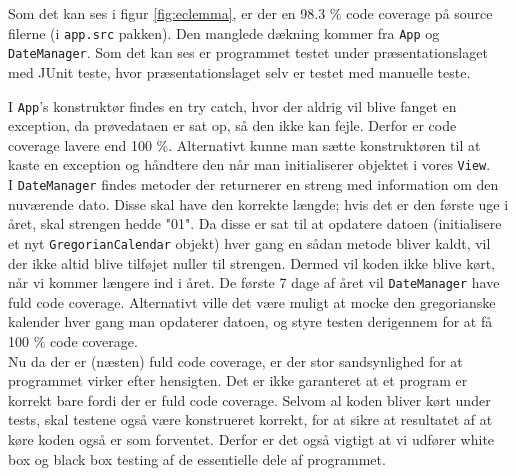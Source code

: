 Som det kan ses i figur \ref{fig:eclemma}, er der en 98.3 \% code coverage på source filerne (i \texttt{app.src} pakken). Den manglede dækning kommer fra \texttt{App} og \texttt{DateManager}. Som det kan ses er programmet testet under præsentationslaget med JUnit teste, hvor præsentationslaget selv er testet med manuelle teste.

I \texttt{App}'s konstruktør findes en try catch, hvor der aldrig vil blive fanget en exception, da prøvedataen er sat op, så den ikke kan fejle. Derfor er code coverage lavere end 100 \%. Alternativt kunne man sætte konstruktøren til at kaste en exception og håndtere den når man initialiserer objektet i vores \texttt{View}. \\

I \texttt{DateManager} findes metoder der returnerer en streng med information om den nuværende dato. Disse skal have den korrekte længde; hvis det er den første uge i året, skal strengen hedde "01". Da disse er sat til at opdatere datoen (initialisere et nyt \texttt{GregorianCalendar} objekt) hver gang en sådan metode bliver kaldt, vil der ikke altid blive tilføjet nuller til strengen. Dermed vil koden ikke blive kørt, når vi kommer længere ind i året.
De første 7 dage af året vil \texttt{DateManager} have fuld code coverage. Alternativt ville det være muligt at mocke den gregorianske kalender hver gang man opdaterer datoen, og styre testen derigennem for at få 100 \% code coverage. \\

Nu da der er (næsten) fuld code coverage, er der stor sandsynlighed for at programmet virker efter hensigten. Det er ikke garanteret at et program er korrekt bare fordi der er fuld code coverage. Selvom al koden bliver kørt under tests, skal testene også være konstrueret korrekt, for at sikre at resultatet af at køre koden også er som forventet. Derfor er det også vigtigt at vi udfører white box og black box testing af de essentielle dele af programmet.


